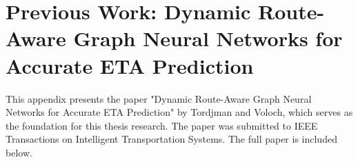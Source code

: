 \appendix

\section{Previous Work: Dynamic Route-Aware Graph Neural Networks for Accurate ETA Prediction}

This appendix presents the paper "Dynamic Route-Aware Graph Neural Networks for Accurate ETA Prediction" by Tordjman and Voloch, which serves as the foundation for this thesis research. The paper was submitted to IEEE Transactions on Intelligent Transportation Systems. The full paper is included below.

\clearpage



